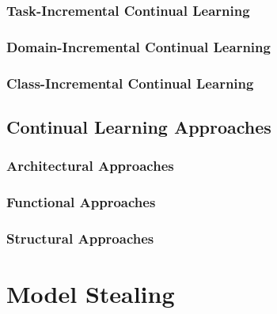 \subsubsection{Task-Incremental Continual Learning}
\label{sec:TaskIncrementalContinualLearning}

\subsubsection{Domain-Incremental Continual Learning}
\label{sec:DomainIncrementalContinualLearning}

\subsubsection{Class-Incremental Continual Learning}
\label{sec:ClassIncrementalContinualLearning}

\subsection{Continual Learning Approaches}
\label{sec:ContinualLearningApproaches}

\subsubsection{Architectural Approaches}
\label{sec:ArchitecturalApproaches}

\subsubsection{Functional Approaches}
\label{sec:FunctionalApproaches}

\subsubsection{Structural Approaches}
\label{sec:StructuralApproaches}

\section{Model Stealing}
\label{sec:ModelStealing}